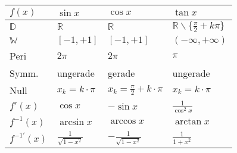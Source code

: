 \begin{tabular}{@{}p{\the\MyLenA}%
				@{}p{}%
				@{}p{}%
				@{}p{}}
	\textbf{$f(x)$}	& \textbf{$\sin x$} 					& \textbf{$\cos x$} 					& \textbf{$\tan x$}\\\hline
	$\mathbb{D}$ 	& $\mathbb{R}$ 							& $\mathbb{R}$ 							& $\mathbb{R} \backslash \{\frac{\pi}{2} + k\pi\}$\\
	$\mathbb{W}$	& $[-1, +1]$							& $[-1, +1]$							& $(-\infty, +\infty)$\\
	Peri			& $2\pi$								& $2\pi$								& $\pi$\\	
	Symm.			& ungerade								& gerade								& ungerade \\
	Null			& $x_k = k \cdot \pi$ 					& $x_k = \frac{\pi}{2} + k \cdot \pi$	& $x_k = k \cdot \pi$\\
	$f'(x)$			& $\cos x$								& $-\sin x$								& $\frac{1}{\cos^2 x}$\\
	$f^{-1}(x)$		& $\arcsin x$							& $\arccos x$							& $\arctan x$\\
	$f^{-1'}(x)$	& $\frac{1}{\sqrt{1-x^2}}$				& $-\frac{1}{\sqrt{1-x^2}}$				& $\frac{1}{1+x^2}$
\end{tabular}